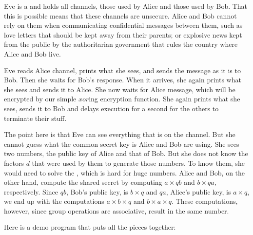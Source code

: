 \documentclass[tikz]{scrreprt}
\newcommand{\Varid}[1]{\mathit{#1}}
\begin{document}
Eve is a  and
holds all channels, those used by Alice and
those used by Bob. That this is possible 
means that these channels are unsecure.
Alice and Bob cannot rely on them when
communicating confidential messages between them,
such as love letters that should be kept
away from their parents; or explosive news
kept from the public by the authoritarian government
that rules the country where Alice and Bob live.

Eve reads Alice channel,
prints what she sees, and sends the message
as it is to Bob. Then she waits for Bob's
response. When it arrives, she again prints
what she sees and sends it to Alice.
She now waits for Alice message, which will
be encrypted by our simple \ensuremath{\Varid{xor}}ing encryption
function. She again prints what she sees,
sends it to Bob and delays execution for a second
for the others to terminate their stuff.

The point here is that Eve can see everything
that is on the channel. But she cannot guess
what the common secret key is Alice and Bob
are using. She sees two numbers, the public
key of Alice and that of Bob. But she does 
not know the factors \ensuremath{\Varid{d}} that were used by them
to generate those numbers. 
To know them, she would need to solve the ,
which is hard for huge numbers.
Alice and Bob, on the other hand, compute the shared
secret by computing $a\times qb$ and $b\times qa$,
respectively. Since $qb$, Bob's public key,
is $b\times q$ and $qa$, Alice's public key,
is $a\times q$, we end up with the computations
$a\times b\times q$ and $b\times a\times q$.
These computations, however, 
since group operations are associative,
result in the same number.

Here is a demo program that puts all the pieces together:
\end{document}
